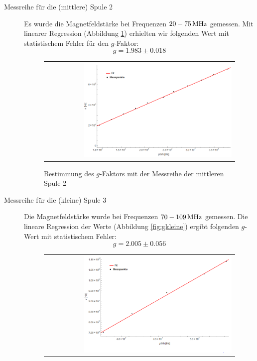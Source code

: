 \documentclass[a4paper,titlepage]{scrartcl}
\numberwithin{equation}{section}
\begin{document}
\begin{description}
\item[Messreihe für die (mittlere) Spule 2] Es wurde die Magnetfeldstärke bei Frequenzen $\unit[20-75]{MHz}$ gemessen. Mit linearer Regression (Abbildung \ref{fig:gmittlere}) erhielten wir folgenden Wert mit statistischem Fehler für den $g$-Faktor:
\begin{equation*}
g=1.983 \pm 0.018
\end{equation*}
\begin{figure}[H]
	\centering
	\begin{tabular}{@{}r@{}}
		\includegraphics[width=0.8\textwidth]{gmittlere.png}\\
	\end{tabular}
	\caption{Bestimmung des $g$-Faktors mit der Messreihe der mittleren Spule 2}
    \label{fig:gmittlere}
\end{figure}
\item[Messreihe für die (kleine) Spule 3] Die Magnetfeldstärke wurde bei Frequenzen $\unit[70-109]{MHz}$ gemessen. Die lineare Regression der Werte (Abbildung \ref{fig:gkleine}) ergibt folgenden $g$-Wert mit statistischem Fehler:
\begin{equation*}
g=2.005 \pm 0.056
\end{equation*}
\begin{figure}[H]
	\centering
	\begin{tabular}{@{}r@{}}
		\includegraphics[width=0.8\textwidth]{gkleine.png}\\

\end{tabular}
\end{figure}
\end{description}
\end{document}
